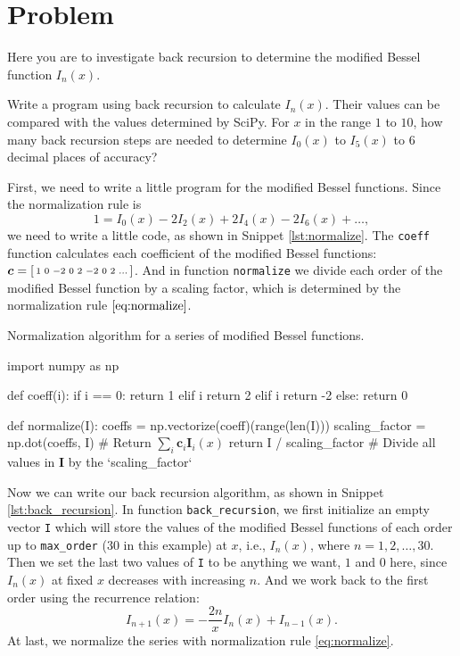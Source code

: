 \section{Problem \thesection}

Here you are to investigate back recursion to determine the modified Bessel function
$I_n(x)$.

\Question Write a program using back recursion to calculate $I_n(x)$.
Their values can be compared with the values determined by SciPy.
For $x$ in the range $1$ to $10$, how many back recursion steps are needed to
determine $I_0(x)$ to $I_5(x)$ to $6$ decimal places of accuracy?

\Answer First, we need to write a little program for the modified Bessel functions.
Since the normalization rule is
%
\begin{equation}\label{eq:normalize}
    1 = I_0(x) - 2 I_2(x) + 2 I_4(x) - 2 I_6(x) + \ldots,
\end{equation}
%
we need to write a little code, as shown in Snippet \ref{lst:normalize}.
The \texttt{coeff} function calculates each coefficient of the
modified Bessel functions: $\bm{c} = \begin{bsmallmatrix}1 & 0 & -2 & 0 & 2 & -2 & 0 & 2 & \ldots\end{bsmallmatrix}$.
And in function \texttt{normalize} we divide each order of the modified Bessel function
by a scaling factor, which is determined by the normalization rule $\eqref{eq:normalize}$.

\begin{listing}[H]
    \centering
    \caption{Normalization algorithm for a series of modified Bessel functions.}
    \label{lst:normalize}
    \begin{pythoncode}
        import numpy as np


        def coeff(i):
            if i == 0:
                return 1
            elif i %
                return 2
            elif i %
                return -2
            else:
                return 0


        def normalize(I):
            coeffs = np.vectorize(coeff)(range(len(I)))
            scaling_factor = np.dot(coeffs, I)  # Return $\sum_i \bm{c}_i \bm{I}_i(x)$
            return I / scaling_factor  # Divide all values in $\bm{I}$ by the `scaling_factor`
    \end{pythoncode}
\end{listing}

Now we can write our back recursion algorithm, as shown in Snippet \ref{lst:back_recursion}.
In function \texttt{back\_recursion}, we first initialize an empty vector \texttt{I} which
will store the values of the modified Bessel functions of each order up to
\texttt{max\_order} ($30$ in this example) at $x$, i.e., $I_n(x)$, where
$n = 1, 2, \ldots, 30$.
Then we set the last two values of \texttt{I} to be anything we want, $1$ and $0$ here,
since $I_n(x)$ at fixed $x$ decreases with increasing $n$.
And we work back to the first order using the recurrence relation:
%
\begin{equation}
    I_{n + 1}(x) = -\frac{ 2 n }{ x } I_n(x) + I_{n - 1}(x).
\end{equation}
%
At last, we normalize the series with normalization rule \eqref{eq:normalize}.

